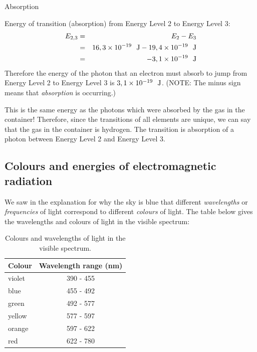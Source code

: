 \begin{wex}{Absorption}
{Energy of transition (absorption) from Energy Level 2 to Energy Level 3:
\begin{eqnarray*}
E_{2,3} &=& E_{2} - E_{3}\\
&=& 16,3 \times 10^{-19}~~\rm{J} - 19,4 \times 10^{-19}~~\rm{J}\\
&=& -3,1 \times 10^{-19}~~\rm{J}
\end{eqnarray*}
Therefore the energy of the photon that an electron must absorb to jump from Energy Level 2 to Energy Level 3 is $3,1 \times 10^{-19}~~\rm{J}$.
(NOTE: The minus sign means that \textit{absorption} is occurring.)

This is the same energy as the photons which were absorbed by the gas in the container! Therefore, since the transitions of all elements are unique, we can say that the gas in the container is hydrogen. The transition is absorption of a photon between Energy Level 2 and Energy Level 3.

}
\end{wex}



\subsection{Colours and energies of electromagnetic radiation}
We saw in the explanation for why the sky is blue that different \textit{wavelengths} or \textit{frequencies} of light correspond to different \textit{colours} of light. The table below gives the wavelengths and colours of light in the visible spectrum:

\begin{table}[H]
\begin{center}
\begin{tabular}{ | l | c |}
\hline
\textbf{Colour} & \textbf{Wavelength range (nm)} \\ \hline \hline
 violet   & 390 - 455  \\ \hline
 blue   &   455 -  492       \\ \hline
 green  &   492 - 577        \\ \hline
 yellow  &  577 - 597       \\ \hline
 orange  &  597 - 622        \\ \hline
 red  &    622 - 780         \\ \hline
\hline
\end{tabular}
\end{center}
\caption{Colours and wavelengths of light in the visible spectrum.}
\label{t:Optic:Colours}
\end{table}

